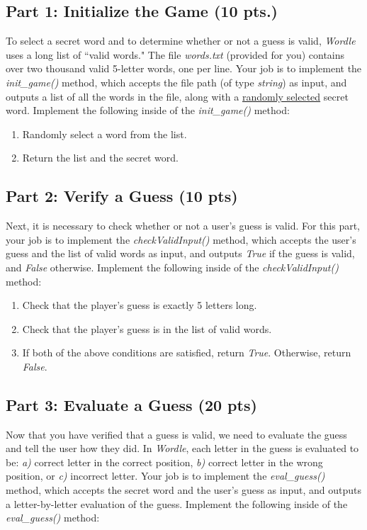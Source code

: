 \documentclass{article}
\begin{document}
\pagebreak

\subsection{Part 1: Initialize the Game (10 pts.)}
\hspace{\parindent} To select a secret word and to determine whether or not a guess is valid, \emph{Wordle} uses a long list of ``valid words." The file \emph{words.txt} (provided for you) contains over two thousand valid 5-letter words, one per line. Your job is to implement the \emph{init\_game()} method, which accepts the file path  (of type \emph{string}) as input, and outputs a list of all the words in the file, along with a \underline{randomly selected} secret word. Implement the following inside of the \emph{init\_game()} method:

\begin{enumerate}
\itemsep0em 
\item{Randomly select a word from the list.}
\item{Return the list and the secret word.}
\end{enumerate}

\subsection{Part 2: Verify a Guess (10 pts)}
\hspace{\parindent}Next, it is necessary to check whether or not a user's guess is valid. For this part, your job is to implement the \emph{checkValidInput()} method, which accepts the user's guess and the list of valid words as input, and outputs \emph{True} if the guess is valid, and \emph{False} otherwise. Implement the following inside of the \emph{checkValidInput()} method:

\begin{enumerate}
\itemsep0em 
\item{Check that the player's guess is exactly 5 letters long.}
\item{Check that the player's guess is in the list of valid words.}
\item{If both of the above conditions are satisfied, return \emph{True}. Otherwise, return \emph{False}.}
\end{enumerate}

\subsection{Part 3: Evaluate a Guess (20 pts)}
\hspace{\parindent}Now that you have verified that a guess is valid, we need to evaluate the guess and tell the user how they did. In \emph{Wordle}, each letter in the guess is evaluated to be: \emph{a)} correct letter in the correct position, \emph{b)} correct letter in the wrong position, or \emph{c)} incorrect letter. Your job is to implement the \emph{eval\_guess()} method, which accepts the secret word and the user's guess as input, and outputs a letter-by-letter evaluation of the guess. Implement the following inside of the \emph{eval\_guess()} method:
\end{document}

